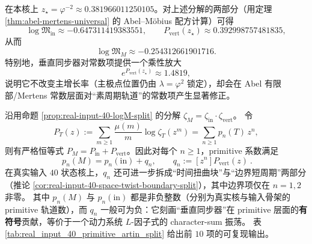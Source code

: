 

\begin{remark}\label{rem:real-input-40-logM-split-numeric}
在本核上 $z_\star=\varphi^{-2}\approx 0.381966011250105$。对上述分解的两部分（用定理 \ref{thm:abel-mertens-universal} 的 Abel--Möbius 配方计算）可得
\[
\log\mathfrak{M}_{\mathrm{in}}\approx -0.647311419383551,
\qquad
P_{\mathrm{vert}}(z_\star)\approx 0.392998757481835,
\]
从而
\[
\log\mathfrak{M}_M\approx -0.254312661901716.
\]
特别地，垂直同步器对常数项提供一个乘性放大
\[
e^{P_{\mathrm{vert}}(z_\star)}\approx 1.4819,
\]
说明它不改变主增长率（主极点位置仍由 $\lambda=\varphi^2$ 锁定），却会在 Abel 有限部/Mertens 常数层面对“素周期轨道”的常数项产生显著修正。
\end{remark}

\begin{remark}\label{rem:real-input-40-primitive-artin-signed}
沿用命题 \ref{prop:real-input-40-logM-split} 的分解 \(\zeta_M=\zeta_{\mathrm{in}}\cdot\zeta_{\mathrm{vert}}\)。
令
\[
P_T(z):=\sum_{m\ge 1}\frac{\mu(m)}{m}\log\zeta_T(z^m)=\sum_{n\ge 1}p_n(T)\,z^n,
\]
则有严格恒等式 \(P_M=P_{\mathrm{in}}+P_{\mathrm{vert}}\)。因此对每个 \(n\ge 1\)，primitive 系数满足
\[
\boxed{\ p_n(M)=p_n(\mathrm{in})+q_n,\qquad q_n:=[z^n]P_{\mathrm{vert}}(z)\ }.
\]
在真实输入 \(40\) 状态核上，\(q_n\) 还可进一步拆成“时间扭曲块”与“边界短周期”两部分（推论 \ref{cor:real-input-40-space-twist-boundary-split}），其中边界项仅在 \(n=1,2\) 非零。
其中 \(p_n(M)\) 与 \(p_n(\mathrm{in})\) 都是非负整数（分别为真实核与输入骨架的 primitive 轨道数），而 \(q_n\) 一般可为负：它刻画“垂直同步器”在 primitive 层面的\textbf{有符号}贡献，等价于一个动力系统 \(L\)-因子式的 character-sum 振荡。
表 \ref{tab:real_input_40_primitive_artin_split} 给出前 \(10\) 项的可复现输出。

\end{remark}



